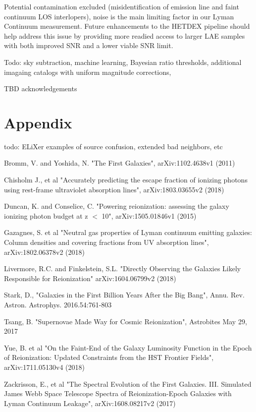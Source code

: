 \documentclass{aastex62}
\begin{document}
Potential contamination excluded (misidentification of emission line and faint continuum LOS interlopers), noise is the main limiting factor in our Lyman Continuum measurement. Future enhancements to the HETDEX pipeline should help address this issue by providing more readied access to larger LAE samples with both improved SNR and a lower viable SNR limit.

Todo: sky subtraction, machine learning, Bayesian ratio thresholds, additional imagaing catalogs with uniform magnitude corrections, 

\acknowledgments

TBD acknowledgements


\appendix

\section{Appendix}
{ \color{red} todo: ELiXer examples of source confusion, extended bad neighbors, etc}

\begin{thebibliography}{}
Bromm, V. and Yoshida, N. "The First Galaxies", arXiv:1102.4638v1 (2011)

Chisholm J., et al "Accurately predicting the escape fraction of ionizing photons using rest-frame ultraviolet absorption lines", arXiv:1803.03655v2 (2018)

Duncan, K. and Conselice, C. "Powering reionization: assessing the galaxy ionizing photon budget at z $<$ 10", arXiv:1505.01846v1 (2015)

Gazagnes, S. et al "Neutral gas properties of Lyman continuum emitting galaxies: Column densities and covering fractions from UV absorption lines", arXiv:1802.06378v2 (2018)

Livermore, R.C. and Finkelstein, S.L. "Directly Observing the Galaxies Likely Responsible for Reionization" arXiv:1604.06799v2 (2018)

Stark, D., "Galaxies in the First Billion Years After the Big Bang", Annu. Rev. Astron. Astrophys. 2016.54:761-803

Tsang, B. "Supernovae Made Way for Cosmic Reionization", Astrobites May 29, 2017

Yue, B. et al "On the Faint-End of the Galaxy Luminosity Function in the Epoch of Reionization: Updated Constraints from the HST Frontier Fields", arXiv:1711.05130v4 (2018)

Zackrisson, E., et al "The Spectral Evolution of the First Galaxies. III. Simulated James Webb Space Telescope Spectra of Reionization-Epoch Galaxies with Lyman Continuum Leakage", arXiv:1608.08217v2 (2017)

\end{thebibliography}
\end{document}
